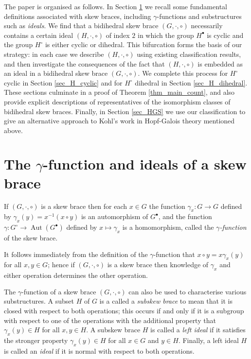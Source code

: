 \documentclass[reqno]{amsart}
\theoremstyle{definition}
\DeclareMathOperator{\Aut}{\mbox{Aut}}
\begin{document}
The paper is organised as follows. In Section \ref{sec_skew_braces} we recall some fundamental definitions associated with skew braces, including $ \gamma $-functions and substructures such as \textit{ideals}. We find that a bidihedral skew brace $ (G,\cdot,\circ) $ necessarily contains a certain ideal $ (H,\cdot,\circ) $ of index $ 2 $ in which the group $ H^{\bullet} $ is cyclic and the group $ H^{\circ} $ is either cyclic or dihedral. This bifurcation forms the basis of our strategy: in each case we describe $ (H,\cdot,\circ) $ using existing classification results, and then investigate the consequences of the fact that $ (H,\cdot,\circ) $ is embedded as an ideal in a bidihedral skew brace $ (G,\cdot,\circ) $. We complete this process for $ H^{\circ} $ cyclic in Section \ref{sec_H_cyclic} and for $ H^{\circ} $ dihedral in Section \ref{sec_H_dihedral}. These sections culminate in a proof of Theorem \ref{thm_main_count}, and also provide explicit descriptions of representatives of the isomorphism classes of bidihedral skew braces. Finally, in Section \ref{sec_HGS} we use our classification to give an alternative approach to Kohl's work in Hopf-Galois theory mentioned above. 

\section{The $\gamma$-function and ideals of a skew brace} \label{sec_skew_braces}

If $ (G,\cdot,\circ) $ is a skew brace then for each $ x \in G $ the function $ \gamma_{x} : G \rightarrow G $ defined by $ \gamma_{x}(y) = x^{-1}(x \circ y) $ is an automorphism of $ G^{\bullet} $, and the function $ \gamma : G^{\circ} \rightarrow \Aut(G^{\bullet}) $ defined by $ x \mapsto \gamma_{x} $ is a homomorphism, called the \textit{$ \gamma $-function} of the skew brace. 

It follows immediately from the definition of the $ \gamma $-function that $ x \circ y = x \gamma_{x}(y) $ for all $ x,y \in G $; hence if $ (G,\cdot,\circ) $ is a skew brace then knowledge of $\gamma_x$ and either operation determines the other operation.

The $ \gamma $-function of a skew brace $ (G,\cdot,\circ) $ can also be used to characterise various substructures. A subset $ H $ of $ G $ is a called a \textit{subskew brace} to mean that it is closed with respect to both operations; this occurs if and only if it is a subgroup with respect to one of the operations with the additional property that $ \gamma_{x}(y) \in H $ for all $ x,y \in H $. A subskew brace $ H $ is called a \textit{left ideal} if it satisfies the stronger property $ \gamma_{x}(y) \in H $ for all $ x \in G $ and $ y \in H $. Finally, a left ideal $ H $ is called an  \textit{ideal} if it is normal with respect to both operations.  
\end{document}
